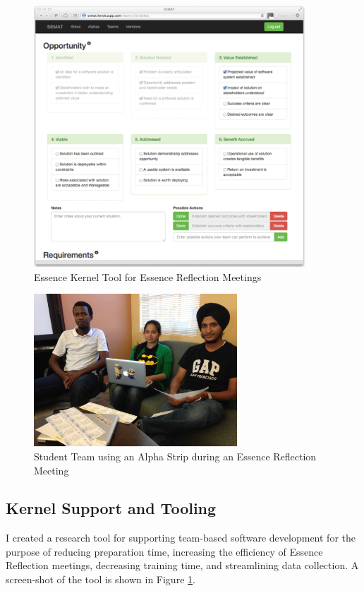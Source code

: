 \documentclass[preprint,12pt,3p]{elsarticle}
\begin{document}
\begin{figure}[ht]
\centering
\includegraphics[width=4.00in]{tool_photos/tool_photo}
\caption{Essence Kernel Tool for Essence Reflection Meetings}
\label{EssenceToolScreenshot}
\end{figure}

\begin{figure}[ht]
\centering
\includegraphics[width=3.00in]{student_photos/team_1}
\caption{Student Team using an Alpha Strip during an Essence Reflection Meeting}
\label{AlphaStrip}
\end{figure}

\subsection{Kernel Support and Tooling}
\label{EssenceTool}
I created a research tool for supporting team-based software development for the purpose of reducing preparation time, increasing the efficiency of Essence Reflection meetings, decreasing training time, and streamlining data collection. A screen-shot of the tool is shown in Figure \ref{EssenceToolScreenshot}. 
\end{document}
